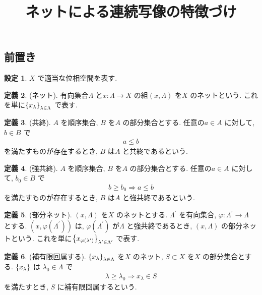 \documentclass[10pt, fleqn, label-section=none]{bxjsarticle}
\title{ネットによる連続写像の特徴づけ}
\date{}
\author{}
\theoremstyle{definition}
\newtheorem{dfn}{定義}[section]
\newtheorem{setting}[dfn]{設定}
\newcommand{\cbra}[1]{\mleft\{#1\mright\}}
\newcommand{\naraba}{\Rightarrow}
\renewcommand{\;}{\, ; \,}
\begin{document}
\maketitle

\section{}

\subsection{前置き}

\begin{setting}
$X$ で適当な位相空間を表す. 
\end{setting}

\begin{dfn}(ネット). 有向集合$\Lambda$ と$x: \Lambda \rightarrow X$ の組$(x, \Lambda)$ を$X$ のネットという. これを単に$\cbra{x_\lambda}_{\lambda \in \Lambda}$ で表す. 

\end{dfn}

\begin{dfn}(共終). $A$ を順序集合, $B$ を$A$ の部分集合とする. 任意の$a \in A$ に対して, $b \in B$ で
\begin{align*} a \leq b \end{align*}
を満たすものが存在するとき, $B$ は$A$ と共終であるという. 
\end{dfn}

\begin{dfn}(強共終). $A$ を順序集合, $B$ を$A$ の部分集合とする. 任意の$a \in A$ に対して, $b_0 \in B$ で
\begin{align*} b \geq b_0 \naraba a \leq b \end{align*}
を満たすものが存在するとき, $B$ は$A$ と強共終であるという. 

\end{dfn}

\begin{dfn}(部分ネット). $(x, \Lambda)$ を$X$ のネットとする. $\Lambda^\prime $ を有向集合, $\varphi: \Lambda^\prime \rightarrow \Lambda$ とする.  $(x, \varphi(\Lambda^\prime))$ は, $\varphi(\Lambda^\prime)$ が$\Lambda$ と強共終であるとき, $(x, \Lambda)$ の部分ネットという. これを単に$\cbra{x_{\varphi(\lambda^\prime)}}_{\lambda^\prime \in \Lambda^\prime }$ で表す. 

\end{dfn}

\begin{dfn}(補有限回属する). $\cbra{x_\lambda}_{\lambda \in \Lambda}$ を$X$ のネット, $S \subset X$ を$X$ の部分集合とする. $\cbra{x_\lambda}$  は $\lambda_0 \in \Lambda$ で
\begin{align*} \lambda \geq \lambda_0 \naraba x_{\lambda} \in S \end{align*}
を満たすとき, $S$ に補有限回属するという. 
\end{dfn}
\end{document}
